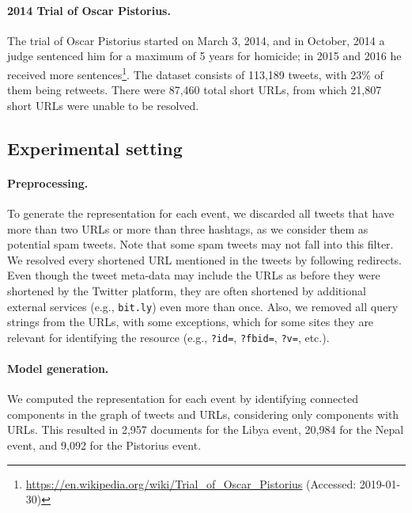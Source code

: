 
\paragraph{2014 Trial of Oscar Pistorius.} 
%
The trial of Oscar Pistorius started on March 3, 2014, and in October, 2014 a
judge sentenced him for a maximum of 5 years for homicide; in 2015 and 2016 he
received more
sentences\footnote{\url{https://en.wikipedia.org/wiki/Trial_of_Oscar_Pistorius}
(Accessed: 2019-01-30)}.
% 
The dataset consists of 113,189 tweets, with 23\% of them being retweets.
%
There were 87,460 total short URLs, from which 21,807 short URLs were unable to
be resolved.





\subsection{Experimental setting}

\paragraph{Preprocessing.}
%
To generate the representation for each event, we discarded all tweets that have
more than two URLs or more than three hashtags, as we consider them as potential
spam tweets. 
%
Note that some spam tweets may not fall into this filter.
%
We resolved every shortened URL mentioned in the tweets by following redirects. 
%
Even though the tweet meta-data may include the URLs as before they were
shortened by the Twitter platform, they are often shortened by additional
external services (e.g., {\tt bit.ly}) even more than once.
%
Also, we removed all query strings from the URLs, with some exceptions, which
for some sites they are relevant for identifying the resource (e.g., {\tt ?id=},
{\tt ?fbid=}, {\tt ?v=}, etc.).


\paragraph{Model generation.} 
%
%
We computed the representation for each event by identifying connected
components in the graph of tweets and URLs, considering only components with
URLs.
%
This resulted in 2,957 documents for the Libya event, 20,984 for the Nepal
event, and 9,092 for the Pistorius event.

